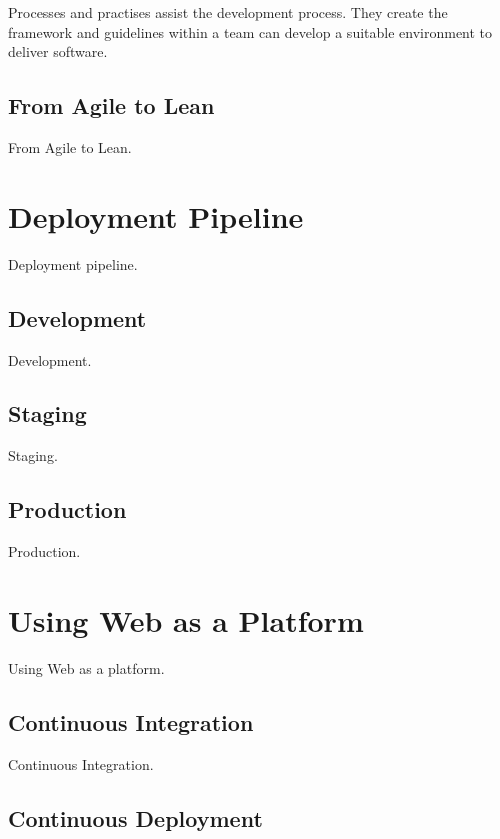 \documentclass[english]{tktltiki2}
\begin{document}
Processes and practises assist the development process. They create the framework and guidelines within a team can develop a suitable environment to deliver software.

\subsection{From Agile to Lean}

From Agile to Lean.


\section{Deployment Pipeline}

Deployment pipeline.

\subsection{Development}

Development.

\subsection{Staging}

Staging.

\subsection{Production}

Production.


\section{Using Web as a Platform}

Using Web as a platform.

\subsection{Continuous Integration}

Continuous Integration.

\subsection{Continuous Deployment}
\end{document}
